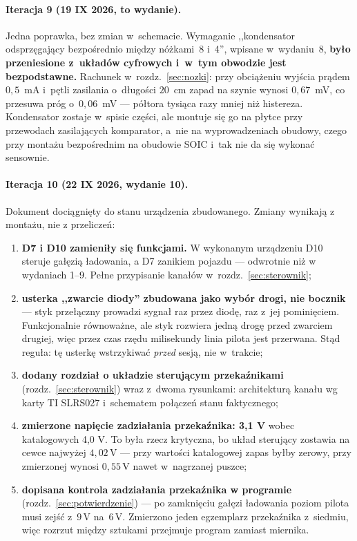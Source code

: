 \documentclass[a4paper,11pt]{article}
\newcommand{\volt}{\,\mathrm{V}}
\begin{document}
\paragraph{Iteracja 9 (19 IX 2026, to wydanie).} Jedna poprawka, bez zmian
w~schemacie. Wymaganie ,,kondensator odsprzęgający bezpośrednio między nóżkami~8
i~4'', wpisane w~wydaniu~8, \textbf{było przeniesione z~układów cyfrowych i~w~tym
obwodzie jest bezpodstawne.} Rachunek w~rozdz.~\ref{sec:nozki}: przy obciążeniu
wyjścia prądem $0{,}5$~mA i~pętli zasilania o~długości $20$~cm zapad na szynie
wynosi $0{,}67$~mV, co przesuwa próg o~$0{,}06$~mV --- półtora tysiąca razy mniej
niż histereza. Kondensator zostaje w~spisie części, ale montuje się go na płytce
przy przewodach zasilających komparator, a~nie na wyprowadzeniach obudowy, czego
przy montażu bezpośrednim na obudowie SOIC i~tak nie da się wykonać sensownie.

\paragraph{Iteracja 10 (22 IX 2026, wydanie 10).} Dokument dociągnięty do stanu
urządzenia zbudowanego. Zmiany wynikają z montażu, nie z przeliczeń:

\begin{enumerate}
\item \textbf{D7 i D10 zamieniły się funkcjami.} W wykonanym urządzeniu D10 steruje
      gałęzią ładowania, a D7 zanikiem pojazdu --- odwrotnie niż w wydaniach 1--9.
      Pełne przypisanie kanałów w~rozdz.~\ref{sec:sterownik};
\item \textbf{usterka ,,zwarcie diody'' zbudowana jako wybór drogi, nie bocznik} ---
      styk przełączny prowadzi sygnał raz przez diodę, raz z~jej pominięciem.
      Funkcjonalnie równoważne, ale styk rozwiera jedną drogę przed zwarciem
      drugiej, więc przez czas rzędu milisekundy linia pilota jest przerwana.
      Stąd reguła: tę usterkę wstrzykiwać \emph{przed} sesją, nie w~trakcie;
\item \textbf{dodany rozdział o układzie sterującym przekaźnikami}
      (rozdz.~\ref{sec:sterownik}) wraz z~dwoma rysunkami: architekturą kanału wg
      karty TI SLRS027 i~schematem połączeń stanu faktycznego;
\item \textbf{zmierzone napięcie zadziałania przekaźnika: 3,1 V} wobec katalogowych
      4,0 V. To była rzecz krytyczna, bo układ sterujący zostawia na cewce najwyżej
      $4{,}02\volt$ --- przy wartości katalogowej zapas byłby zerowy, przy zmierzonej
      wynosi $0{,}55\volt$ nawet w~nagrzanej puszce;
\item \textbf{dopisana kontrola zadziałania przekaźnika w programie}
      (rozdz.~\ref{sec:potwierdzenie}) --- po zamknięciu gałęzi ładowania poziom
      pilota musi zejść z~$9\volt$ na~$6\volt$. Zmierzono jeden egzemplarz
      przekaźnika z~siedmiu, więc rozrzut między sztukami przejmuje program zamiast
      miernika.
\end{enumerate}
\end{document}
